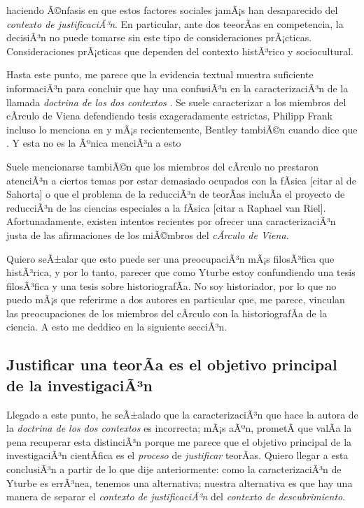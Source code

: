 haciendo Ã©nfasis en que estos factores sociales jamÃ¡s han desaparecido del \emph{contexto de justificaciÃ³n}.
En particular, ante dos teeorÃ­as en competencia, la decisiÃ³n no puede tomarse sin este tipo de consideraciones prÃ¡cticas.
Consideraciones prÃ¡cticas que dependen del contexto histÃ³rico y sociocultural.

Hasta este punto, me parece que la evidencia textual muestra suficiente informaciÃ³n para concluir que hay una confusiÃ³n en la caracterizaciÃ³n de la llamada \emph{doctrina de los dos contextos} \parencite{Yturbe1995}.
Se suele caracterizar a los miembros del cÃ­rculo de Viena defendiendo tesis exageradamente estrictas, Philipp Frank incluso lo menciona en  y mÃ¡s recientemente, Bentley tambiÃ©n cuando dice que .
Y esta no es la Ãºnica menciÃ³n a esto 

Suele mencionarse tambiÃ©n que los miembros del cÃ­rculo no prestaron atenciÃ³n a ciertos temas por estar demasiado ocupados con la fÃ­sica [citar al de Sahorta] o que el problema de la reducciÃ³n de teorÃ­as incluÃ­a el proyecto de reducciÃ³n de las ciencias especiales a la fÃ­sica [citar a Raphael van Riel].
Afortunadamente, existen intentos recientes por ofrecer una caracterizaciÃ³n justa de las afirmaciones de los miÃ©mbros del \emph{cÃ­rculo de Viena.}

Quiero seÃ±alar que esto puede ser una preocupaciÃ³n mÃ¡s filosÃ³fica que histÃ³rica, y por lo tanto, parecer que como Yturbe \cite{Yturbe1995} estoy confundiendo una tesis filosÃ³fica y una tesis sobre historiografÃ­a.
No soy historiador, por lo que no puedo mÃ¡s que referirme a dos autores en particular que, me parece, vinculan las preocupaciones de los miembros del cÃ­rculo con la historiografÃ­a de la ciencia.
A esto me deddico en la siguiente secciÃ³n.


\subsection{Justificar una teorÃ­a es el objetivo principal de la investigaciÃ³n}

Llegado a este punto, he seÃ±alado que la caracterizaciÃ³n que hace la autora de la \emph{doctrina de los dos contextos} es incorrecta; 
mÃ¡s aÃºn, prometÃ­ que valÃ­a la pena recuperar esta distinciÃ³n porque me parece que el objetivo principal de la investigaciÃ³n 
cientÃ­fica es el \emph{proceso} de \emph{justificar} teorÃ­as.
Quiero llegar a esta conclusiÃ³n a partir de lo que dije anteriormente: como la caracterizaciÃ³n de Yturbe es errÃ³nea, tenemos una alternativa; 
nuestra alternativa es que hay una manera de separar el \emph{contexto de justificaciÃ³n} del \emph{contexto de descubrimiento}.




